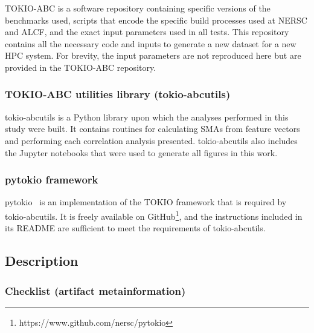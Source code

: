 TOKIO-ABC is a software repository containing specific versions of the benchmarks used, scripts that encode the specific build processes used at NERSC and ALCF, and the exact input parameters used in all tests.
This repository contains all  the necessary code and inputs to generate a new dataset for a new HPC system.
For brevity, the input parameters are not reproduced here but are provided in the TOKIO-ABC repository.

\subsubsection{TOKIO-ABC utilities library (tokio-abcutils)}

tokio-abcutils is a Python library upon which the analyses performed in this study were built.
It contains routines for calculating SMAs from feature vectors and performing each correlation analysis presented.
tokio-abcutils also includes the Jupyter notebooks that were used to generate all figures in this work.

\subsubsection{pytokio framework}

pytokio~\cite{Lockwood2018tokio} is an implementation of the TOKIO framework that is required by tokio-abcutils.
It is freely available on GitHub\footnote{https://www.github.com/nersc/pytokio}, and the instructions included in its README are sufficient to meet the requirements of tokio-abcutils.

\subsection{Description}

\subsubsection{Checklist (artifact metainformation)}

